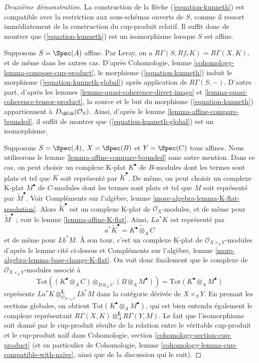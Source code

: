 \begin{proof}[Deuxième démonstration]
La construction de la flèche (\ref{equation-kunneth}) est compatible
avec la restriction aux sous-schémas ouverts de $S$, comme il ressort
immédiatement de la construction du cup-produit relatif. Il suffit donc de montrer
que (\ref{equation-kunneth}) est un isomorphisme lorsque $S$ est affine.

\medskip\noindent
Supposons $S = \Spec(A)$ affine. Par Leray, on a
$R\Gamma(S, Rf_*K) = R\Gamma(X, K)$, et de même dans les autres cas.
D'après Cohomologie, lemme \ref{cohomology-lemma-compose-cup-product},
le morphisme (\ref{equation-kunneth}) induit le morphisme
(\ref{equation-kunneth-global}) après application de $R\Gamma(S, -)$.
D'autre part, d'après les lemmes \ref{lemma-quasi-coherence-direct-image} et
\ref{lemma-quasi-coherence-tensor-product},
la source et le but du morphisme
(\ref{equation-kunneth}) appartiennent à $D_\QCoh(\mathcal{O}_S)$.
Ainsi, d'après le lemme \ref{lemma-affine-compare-bounded}, il suffit de montrer que
(\ref{equation-kunneth-global}) est un isomorphisme.

\medskip\noindent
Supposons $S = \Spec(A)$, $X = \Spec(B)$ et $Y = \Spec(C)$ tous affines.
Nous utiliserons le lemme \ref{lemma-affine-compare-bounded} sans autre mention.
Dans ce cas, on peut choisir un complexe K-plat $K^\bullet$ de $B$-modules
dont les termes sont plats et tel que $K$ soit représenté par $\widetilde{K}^\bullet$.
De même, on peut choisir un complexe K-plat $M^\bullet$ de $C$-modules
dont les termes sont plats et tel que $M$ soit représenté par $\widetilde{M}^\bullet$.
Voir Compléments sur l'algèbre, lemme \ref{more-algebra-lemma-K-flat-resolution}.
Alors $\widetilde{K}^\bullet$ est un complexe K-plat de $\mathcal{O}_X$-modules,
et de même pour $\widetilde{M}^\bullet$ ; voir
le lemme \ref{lemma-affine-K-flat}. Ainsi,
$La^*K$ est représenté par
$$
a^*\widetilde{K}^\bullet = \widetilde{K^\bullet \otimes_A C}
$$
et de même pour $Lb^*M$. À son tour, c'est un complexe K-plat
de $\mathcal{O}_{X \times_S Y}$-modules d'après le lemme cité ci-dessus
et Compléments sur l'algèbre, lemme \ref{more-algebra-lemma-base-change-K-flat}.
On voit donc finalement que le complexe de
$\mathcal{O}_{X \times_S Y}$-modules associé à
$$
\text{Tot}((K^\bullet \otimes_A C) \otimes_{B \otimes_A C}
(B \otimes_A M^\bullet)) =
\text{Tot}(K^\bullet \otimes_A M^\bullet)
$$
représente $La^*K \otimes_{\mathcal{O}_{X \times_S Y}}^\mathbf{L} Lb^*M$
dans la catégorie dérivée de $X \times_S Y$. En prenant les sections globales,
on obtient $\text{Tot}(K^\bullet \otimes_A M^\bullet)$, qui est bien entendu
également le complexe représentant
$R\Gamma(X, K) \otimes_A^\mathbf{L} R\Gamma(Y, M)$.
Le fait que l'isomorphisme soit donné par le cup-produit résulte de la
relation entre le véritable cup-produit et le cup-produit naïf
dans Cohomologie, section \ref{cohomology-section-cup-product}
(et en particulier de
Cohomologie, lemme \ref{cohomology-lemma-cup-compatible-with-naive},
ainsi que de la discussion qui le suit).


\end{proof}
